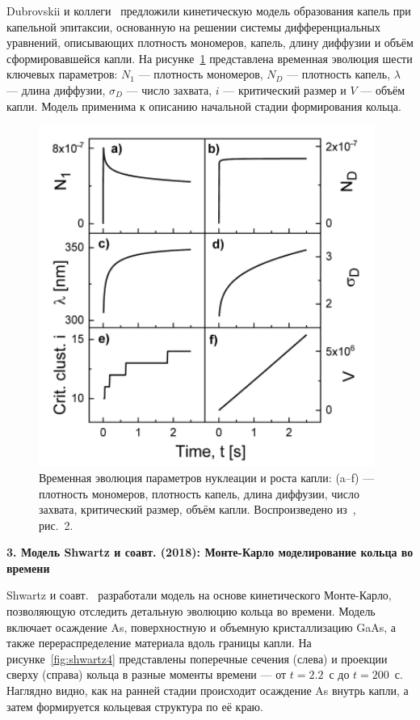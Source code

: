 \documentclass[14pt,oneside]{extarticle}
\begin{document}
Dubrovskii и коллеги~\cite{dubrovskii2021} предложили кинетическую модель образования капель при капельной эпитаксии, основанную на решении системы дифференциальных уравнений, описывающих плотность мономеров, капель, длину диффузии и объём сформировавшейся капли. На рисунке~\ref{fig:dubrovskii_model} представлена временная эволюция шести ключевых параметров: $N_1$ — плотность мономеров, $N_D$ — плотность капель, $\lambda$ — длина диффузии, $\sigma_D$ — число захвата, $i$ — критический размер и $V$ — объём капли. Модель применима к описанию начальной стадии формирования кольца.

\begin{figure}
    \begin{center}
        \includegraphics[width=11cm]{images/dubrovskii_fig2.png}
        \caption{\label{fig:dubrovskii_model}
            Временная эволюция параметров нуклеации и роста капли: (a--f) — плотность мономеров, плотность капель, длина диффузии, число захвата, критический размер, объём капли. Воспроизведено из~\cite{dubrovskii2021}, рис.~2.}
    \end{center}
\end{figure}

\vspace{0.5em}
\noindent\textbf{3. Модель Shwartz и соавт. (2018): Монте-Карло моделирование кольца во времени}

Shwartz и соавт.~\cite{shwartz2018} разработали модель на основе кинетического Монте-Карло, позволяющую отследить детальную эволюцию кольца во времени. Модель включает осаждение As, поверхностную и объемную кристаллизацию GaAs, а также перераспределение материала вдоль границы капли. На рисунке~\ref{fig:shwartz4} представлены поперечные сечения (слева) и проекции сверху (справа) кольца в разные моменты времени — от $t = 2.2$~с до $t = 200$~с. Наглядно видно, как на ранней стадии происходит осаждение As внутрь капли, а затем формируется кольцевая структура по её краю.
\end{document}
